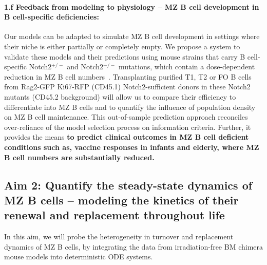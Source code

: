 \documentclass[11pt]{article}
\newcommand{\para}[1]{\vspace*{-4.5mm}\paragraph{#1}}
\begin{document}
\para{{1.f Feedback from modeling to physiology -- MZ B cell development in B cell-specific deficiencies:}}
Our models can be adapted to simulate MZ B cell development in settings where their niche is either partially or completely empty. %
We propose a system to validate these models and their predictions using mouse strains that carry B cell-specific Notch2$^{+/-}$ and Notch2$^{-/-}$ mutations, which contain a dose-dependent reduction in MZ B cell numbers~\cite{Witt_2003, Saito_2003}.
Transplanting purified T1, T2 or FO B cells from Rag2-GFP Ki67-RFP (CD45.1) Notch2-sufficient donors in these Notch2 mutants (CD45.2 background) will allow us to compare their efficiency to differentiate into MZ B cells and to quantify the influence of population density on MZ B cell maintenance. 
This out-of-sample prediction approach reconciles over-reliance of the model selection process on information criteria. %
Further, it provides the means \textbf{to predict clinical outcomes in MZ B cell deficient conditions such as, vaccine responses in infants and elderly, where MZ B cell numbers are substantially reduced.
}

\subsection*{Aim 2: Quantify the steady-state dynamics of MZ B cells -- modeling the kinetics of their\\ renewal and replacement throughout life}

In this aim, we will probe the heterogeneity in  turnover and replacement dynamics of MZ B cells, by integrating the data from irradiation-free BM chimera mouse models into deterministic ODE systems.
\end{document}
